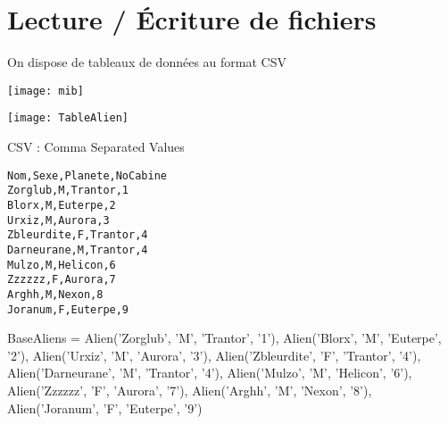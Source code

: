 \documentclass[french]{beamer}
\begin{document}
\section{Lecture / Écriture de fichiers}

\begin{frame}
  On dispose de tableaux de données au format CSV
\end{frame}

\begin{frame}
  
\begin{center}
  \texttt{[image: mib]}
\end{center}

\end{frame}



\begin{frame}

\begin{center}
  \texttt{[image: TableAlien]}
\end{center}

\end{frame}

\begin{frame}[fragile]

CSV : Comma Separated Values
  
\begin{verbatim}
Nom,Sexe,Planete,NoCabine
Zorglub,M,Trantor,1
Blorx,M,Euterpe,2
Urxiz,M,Aurora,3
Zbleurdite,F,Trantor,4
Darneurane,M,Trantor,4
Mulzo,M,Helicon,6
Zzzzzz,F,Aurora,7
Arghh,M,Nexon,8
Joranum,F,Euterpe,9
 \end{verbatim}
\end{frame}

\begin{frame}[fragile]
\begin{pythoncode}
BaseAliens = {
        Alien('Zorglub', 'M', 'Trantor', '1'),
        Alien('Blorx', 'M', 'Euterpe', '2'),
        Alien('Urxiz', 'M', 'Aurora', '3'),
        Alien('Zbleurdite', 'F', 'Trantor', '4'),
        Alien('Darneurane', 'M', 'Trantor', '4'),
        Alien('Mulzo', 'M', 'Helicon', '6'),
        Alien('Zzzzzz', 'F', 'Aurora', '7'),
        Alien('Arghh', 'M', 'Nexon', '8'),
        Alien('Joranum', 'F', 'Euterpe', '9')
}
\end{pythoncode}
\end{frame}
\end{document}
